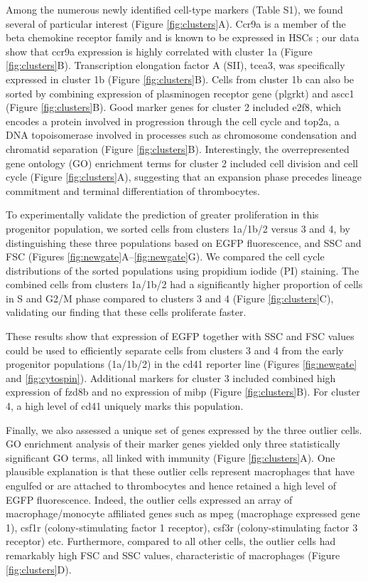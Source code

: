 Among the numerous newly identified cell-type markers (Table S1), we found several of particular interest (Figure \ref{fig:clusters}A). Ccr9a is a member of the beta chemokine receptor family and is known to be expressed in HSCs \cite{Wright2002-xi}; our data show that ccr9a expression is highly correlated with cluster 1a (Figure \ref{fig:clusters}B). Transcription elongation factor A (SII), tcea3, was specifically expressed in cluster 1b (Figure \ref{fig:clusters}B). Cells from cluster 1b can also be sorted by combining expression of plasminogen receptor gene (plgrkt) and ascc1 (Figure \ref{fig:clusters}B). Good marker genes for cluster 2 included e2f8, which encodes a protein involved in progression through the cell cycle \cite{Deng2010-am} and top2a, a DNA topoisomerase involved in processes such as chromosome condensation and chromatid separation  \cite{Downes1994-sl} (Figure \ref{fig:clusters}B). Interestingly, the overrepresented gene ontology (GO) enrichment terms for cluster 2 included cell division and cell cycle (Figure \ref{fig:clusters}A), suggesting that an expansion phase precedes lineage commitment and terminal differentiation of thrombocytes.

To experimentally validate the prediction of greater proliferation in this progenitor population, we sorted cells from clusters 1a/1b/2 versus 3 and 4, by distinguishing these three populations based on EGFP fluorescence, and SSC and FSC (Figures \ref{fig:newgate}A–\ref{fig:newgate}G). We compared the cell cycle distributions of the sorted populations using propidium iodide (PI) staining. The combined cells from clusters 1a/1b/2 had a significantly higher proportion of cells in S and G2/M phase compared to clusters 3 and 4 (Figure \ref{fig:clusters}C), validating our finding that these cells proliferate faster.

These results show that expression of EGFP together with SSC and FSC values could be used to efficiently separate cells from clusters 3 and 4 from the early progenitor populations (1a/1b/2) in the cd41 reporter line (Figures \ref{fig:newgate} and \ref{fig:cytospin}). Additional markers for cluster 3 included combined high expression of fzd8b and no expression of mibp (Figure \ref{fig:clusters}B). For cluster 4, a high level of cd41 uniquely marks this population.

Finally, we also assessed a unique set of genes expressed by the three outlier cells. GO enrichment analysis of their marker genes yielded only three statistically significant GO terms, all linked with immunity (Figure \ref{fig:clusters}A). One plausible explanation is that these outlier cells represent macrophages that have engulfed or are attached to thrombocytes and hence retained a high level of EGFP fluorescence. Indeed, the outlier cells expressed an array of macrophage/monocyte affiliated genes such as mpeg (macrophage expressed gene 1), csf1r (colony-stimulating factor 1 receptor), csf3r (colony-stimulating factor 3 receptor) etc. Furthermore, compared to all other cells, the outlier cells had remarkably high FSC and SSC values, characteristic of macrophages (Figure \ref{fig:clusters}D).

